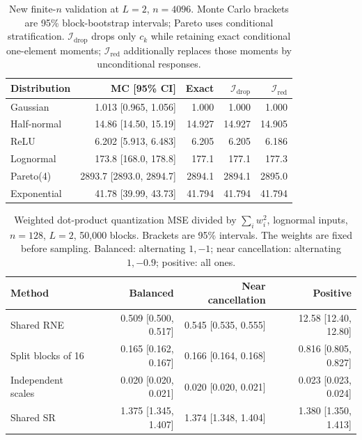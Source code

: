 \begin{table}[t]
\centering\footnotesize
\caption{New finite-$n$ validation at $L=2$, $n=4096$. Monte Carlo brackets are 95\% block-bootstrap intervals; Pareto uses conditional stratification. $\mathcal I_{\mathrm{drop}}$ drops only $c_k$ while retaining exact conditional one-element moments; $\mathcal I_{\mathrm{red}}$ additionally replaces those moments by unconditional responses.}\label{tab:revision-validation}
\begin{tabular}{@{}lrrrr@{}}\toprule
Distribution & MC [95\% CI] & Exact & $\mathcal I_{\mathrm{drop}}$ & $\mathcal I_{\mathrm{red}}$\\\midrule
Gaussian & 1.013 [0.965, 1.056] & 1.000 & 1.000 & 1.000\\
Half-normal & 14.86 [14.50, 15.19] & 14.927 & 14.927 & 14.905\\
ReLU & 6.202 [5.913, 6.483] & 6.205 & 6.205 & 6.186\\
Lognormal & 173.8 [168.0, 178.8] & 177.1 & 177.1 & 177.3\\
Pareto(4) & 2893.7 [2893.0, 2894.7] & 2894.1 & 2894.1 & 2895.0\\
Exponential & 41.78 [39.99, 43.73] & 41.794 & 41.794 & 41.794\\
\bottomrule\end{tabular}
\end{table}
\begin{table}[t]
\centering\footnotesize
\caption{Weighted dot-product quantization MSE divided by $\sum_iw_i^2$, lognormal inputs, $n=128$, $L=2$, 50,000 blocks. Brackets are 95\% intervals. The weights are fixed before sampling. Balanced: alternating $1,-1$; near cancellation: alternating $1,-0.9$; positive: all ones.}\label{tab:revision-weighted}
\begin{tabular}{@{}lrrr@{}}\toprule
Method & Balanced & Near cancellation & Positive\\\midrule
Shared RNE & 0.509 [0.500, 0.517] & 0.545 [0.535, 0.555] & 12.58 [12.40, 12.80]\\
Split blocks of 16 & 0.165 [0.162, 0.167] & 0.166 [0.164, 0.168] & 0.816 [0.805, 0.827]\\
Independent scales & 0.020 [0.020, 0.021] & 0.020 [0.020, 0.021] & 0.023 [0.023, 0.024]\\
Shared SR & 1.375 [1.345, 1.407] & 1.374 [1.348, 1.404] & 1.380 [1.350, 1.413]\\
\bottomrule\end{tabular}
\end{table}
